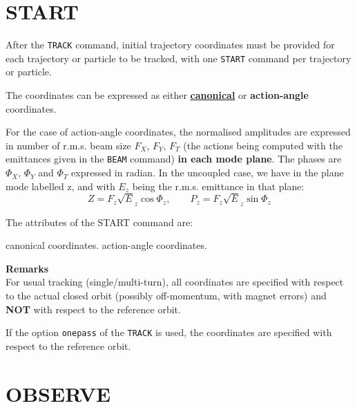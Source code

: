 \section{START}
\label{sec:start}

After the \texttt{TRACK} command, initial trajectory coordinates must be
provided for each trajectory or particle to be tracked, with one
\texttt{START} command per trajectory or particle.

The coordinates can be expressed as either
\hyperref[subsec:tables-canon]{\textbf{canonical}}
or \textbf{action-angle} coordinates.


For the case of action-angle coordinates, the normalised amplitudes are
expressed in number of r.m.s. beam size $F_X$, $F_Y$, $F_T$ (the actions
being computed with the emittances given in the \texttt{BEAM} command)
\textbf{in each mode plane}. 
The phases are $\Phi_X$, $\Phi_Y$ and $\Phi_T$ expressed in
radian. In the uncoupled case, we have in the plane mode labelled z, and
with $E_z$ being the r.m.s. emittance in that plane:\\
\begin{equation}
Z = F_z \sqrt E_z \cos\Phi_z , \qquad P_z= F_z \sqrt E_z \sin\Phi_z
\end{equation}

The attributes of the START command are:
\begin{madlist}
   canonical coordinates. 
   action-angle coordinates.
\end{madlist}

\textbf{Remarks} \\
For usual tracking (single/multi-turn), all coordinates are specified
with respect to the actual closed orbit (possibly off-momentum, with
magnet errors) and \textbf{NOT} with respect to the reference orbit.

If the option \texttt{onepass} of the \texttt{TRACK} is used, the
coordinates are specified with respect to the reference orbit.

\section{OBSERVE}
\label{sec:observe}

